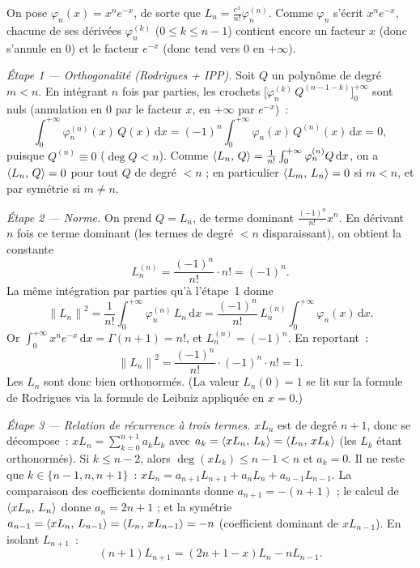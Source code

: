 \begin{mdframed}[style=proofbar]
  On pose $\varphi_n(x)=x^n e^{-x}$, de sorte que
  $L_n=\frac{e^{x}}{n!}\varphi_n^{(n)}$. Comme $\varphi_n$ s'écrit
  $x^n e^{-x}$, chacune de ses dérivées $\varphi_n^{(k)}$ ($0\leq k\leq n-1$)
  contient encore un facteur $x$ (donc s'annule en $0$) et le facteur $e^{-x}$
  (donc tend vers $0$ en $+\infty$).

  \medskip
  \textit{Étape 1 — Orthogonalité (Rodrigues + IPP).}
  Soit $Q$ un polynôme de degré $m<n$. En intégrant $n$ fois par parties,
  les crochets $\bigl[\varphi_n^{(k)}\,Q^{(n-1-k)}\bigr]_{0}^{+\infty}$ sont
  nuls (annulation en $0$ par le facteur $x$, en $+\infty$ par $e^{-x}$)~:
  \[
    \int_{0}^{+\infty} \varphi_n^{(n)}(x)\,Q(x)\,\mathrm{d}x
    = {(-1)}^n \int_{0}^{+\infty} \varphi_n(x)\,Q^{(n)}(x)\,\mathrm{d}x = 0,
  \]
  puisque $Q^{(n)}\equiv 0$ ($\deg Q<n$). Comme
  $\langle L_n,\,Q\rangle=\frac{1}{n!}\int_0^{+\infty}\varphi_n^{(n)}Q\,\mathrm{d}x$,
  on a $\langle L_n,\,Q\rangle=0$ pour tout $Q$ de degré $<n$ ; en particulier
  $\langle L_m,\,L_n\rangle=0$ si $m<n$, et par symétrie si $m\neq n$.

  \medskip
  \textit{Étape 2 — Norme.} On prend $Q=L_n$, de terme dominant
  $\frac{{(-1)}^n}{n!}x^n$. En dérivant $n$ fois ce terme dominant (les termes
  de degré $<n$ disparaissant), on obtient la constante
  \[
    L_n^{(n)}=\frac{{(-1)}^n}{n!}\cdot n!={(-1)}^n.
  \]
  La même intégration par parties qu'à l'étape~1 donne
  \[
    {\|L_n\|}^2 = \frac{1}{n!}\int_{0}^{+\infty}\varphi_n^{(n)}\,L_n\,\mathrm{d}x
    = \frac{{(-1)}^n}{n!}\,L_n^{(n)}\int_{0}^{+\infty}\varphi_n(x)\,\mathrm{d}x.
  \]
  Or $\int_{0}^{+\infty} x^n e^{-x}\,\mathrm{d}x=\Gamma(n+1)=n!$, et
  $L_n^{(n)}={(-1)}^n$. En reportant~:
  \[
    {\|L_n\|}^2 = \frac{{(-1)}^n}{n!}\cdot{(-1)}^n\cdot n! = 1.
  \]
  Les $L_n$ sont donc bien orthonormés. (La valeur $L_n(0)=1$ se lit sur
  la formule de Rodrigues via la formule de Leibniz appliquée en $x=0$.)

  \medskip
  \textit{Étape 3 — Relation de récurrence à trois termes.}
  $x L_n$ est de degré $n+1$, donc se décompose~:
  $x L_n=\sum_{k=0}^{n+1} a_k L_k$ avec
  $a_k=\langle xL_n,\,L_k\rangle=\langle L_n,\,xL_k\rangle$ (les $L_k$ étant orthonormés).
  Si $k\leq n-2$, alors $\deg(xL_k)\leq n-1<n$ et $a_k=0$. Il ne reste que
  $k\in\{n-1,n,n+1\}$~: $x L_n=a_{n+1}L_{n+1}+a_n L_n+a_{n-1}L_{n-1}$.
  La comparaison des coefficients dominants donne $a_{n+1}=-(n+1)$ ; le calcul
  de $\langle xL_n,\,L_n\rangle$ donne $a_n=2n+1$ ; et la symétrie
  $a_{n-1}=\langle xL_n,\,L_{n-1}\rangle=\langle L_n,\,xL_{n-1}\rangle=-n$ (coefficient
  dominant de $xL_{n-1}$). En isolant $L_{n+1}$~:
  \[
    (n+1)L_{n+1}=(2n+1-x)L_n-nL_{n-1}.
  \]


\end{mdframed}
